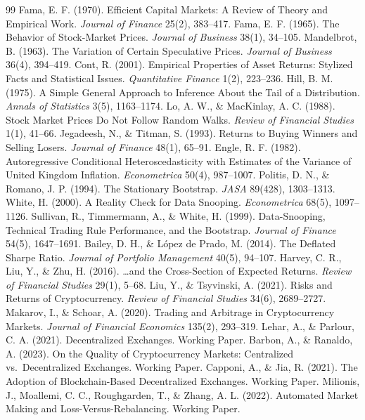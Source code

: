 \documentclass[12pt]{article}
\begin{document}
\begin{thebibliography}{99}
\small
{} Fama, E. F. (1970). Efficient Capital Markets: A Review of Theory and Empirical Work. \textit{Journal of Finance} 25(2), 383--417.
 Fama, E. F. (1965). The Behavior of Stock-Market Prices. \textit{Journal of Business} 38(1), 34--105.
 Mandelbrot, B. (1963). The Variation of Certain Speculative Prices. \textit{Journal of Business} 36(4), 394--419.
 Cont, R. (2001). Empirical Properties of Asset Returns: Stylized Facts and Statistical Issues. \textit{Quantitative Finance} 1(2), 223--236.
 Hill, B. M. (1975). A Simple General Approach to Inference About the Tail of a Distribution. \textit{Annals of Statistics} 3(5), 1163--1174.
 Lo, A. W., \& MacKinlay, A. C. (1988). Stock Market Prices Do Not Follow Random Walks. \textit{Review of Financial Studies} 1(1), 41--66.
 Jegadeesh, N., \& Titman, S. (1993). Returns to Buying Winners and Selling Losers. \textit{Journal of Finance} 48(1), 65--91.
 Engle, R. F. (1982). Autoregressive Conditional Heteroscedasticity with Estimates of the Variance of United Kingdom Inflation. \textit{Econometrica} 50(4), 987--1007.
 Politis, D. N., \& Romano, J. P. (1994). The Stationary Bootstrap. \textit{JASA} 89(428), 1303--1313.
 White, H. (2000). A Reality Check for Data Snooping. \textit{Econometrica} 68(5), 1097--1126.
 Sullivan, R., Timmermann, A., \& White, H. (1999). Data-Snooping, Technical Trading Rule Performance, and the Bootstrap. \textit{Journal of Finance} 54(5), 1647--1691.
 Bailey, D. H., \& L\'opez de Prado, M. (2014). The Deflated Sharpe Ratio. \textit{Journal of Portfolio Management} 40(5), 94--107.
 Harvey, C. R., Liu, Y., \& Zhu, H. (2016). \ldots and the Cross-Section of Expected Returns. \textit{Review of Financial Studies} 29(1), 5--68.
 Liu, Y., \& Tsyvinski, A. (2021). Risks and Returns of Cryptocurrency. \textit{Review of Financial Studies} 34(6), 2689--2727.
 Makarov, I., \& Schoar, A. (2020). Trading and Arbitrage in Cryptocurrency Markets. \textit{Journal of Financial Economics} 135(2), 293--319.
 Lehar, A., \& Parlour, C. A. (2021). Decentralized Exchanges. Working Paper.
 Barbon, A., \& Ranaldo, A. (2023). On the Quality of Cryptocurrency Markets: Centralized vs.\ Decentralized Exchanges. Working Paper.
 Capponi, A., \& Jia, R. (2021). The Adoption of Blockchain-Based Decentralized Exchanges. Working Paper.
 Milionis, J., Moallemi, C. C., Roughgarden, T., \& Zhang, A. L. (2022). Automated Market Making and Loss-Versus-Rebalancing. Working Paper.
\end{thebibliography}
\end{document}

